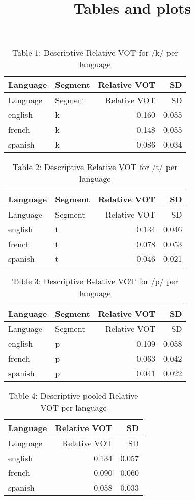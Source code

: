 \documentclass[
]{article}
\title{Tables and plots}
\author{}
\date{\vspace{-2.5em}}
\begin{document}
\maketitle

\begin{longtable}[]{@{}llrr@{}}
\caption{Table 1: Descriptive Relative VOT for /k/ per
language}\tabularnewline
\toprule
Language & Segment & Relative VOT & SD \\
\midrule
\endfirsthead
\toprule
Language & Segment & Relative VOT & SD \\
\midrule
\endhead
english & k & 0.160 & 0.055 \\
french & k & 0.148 & 0.055 \\
spanish & k & 0.086 & 0.034 \\
\bottomrule
\end{longtable}

\begin{longtable}[]{@{}llrr@{}}
\caption{Table 2: Descriptive Relative VOT for /t/ per
language}\tabularnewline
\toprule
Language & Segment & Relative VOT & SD \\
\midrule
\endfirsthead
\toprule
Language & Segment & Relative VOT & SD \\
\midrule
\endhead
english & t & 0.134 & 0.046 \\
french & t & 0.078 & 0.053 \\
spanish & t & 0.046 & 0.021 \\
\bottomrule
\end{longtable}

\begin{longtable}[]{@{}llrr@{}}
\caption{Table 3: Descriptive Relative VOT for /p/ per
language}\tabularnewline
\toprule
Language & Segment & Relative VOT & SD \\
\midrule
\endfirsthead
\toprule
Language & Segment & Relative VOT & SD \\
\midrule
\endhead
english & p & 0.109 & 0.058 \\
french & p & 0.063 & 0.042 \\
spanish & p & 0.041 & 0.022 \\
\bottomrule
\end{longtable}

\begin{longtable}[]{@{}lrr@{}}
\caption{Table 4: Descriptive pooled Relative VOT per
language}\tabularnewline
\toprule
Language & Relative VOT & SD \\
\midrule
\endfirsthead
\toprule
Language & Relative VOT & SD \\
\midrule
\endhead
english & 0.134 & 0.057 \\
french & 0.090 & 0.060 \\
spanish & 0.058 & 0.033 \\
\bottomrule
\end{longtable}
\end{document}
